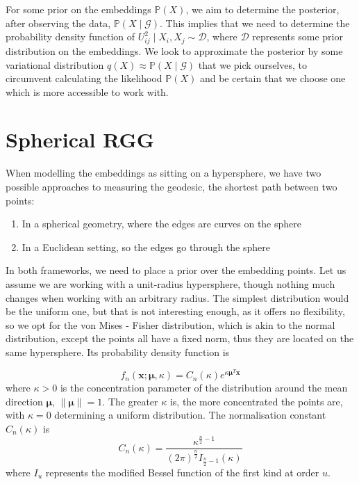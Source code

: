 \documentclass[12pt]{report}
\newcommand{\bs}{\boldsymbol}
\newcommand{\mc}[1]{\mathcal{#1}}
\newcommand{\mb}[1]{\mathbb{#1}}
\renewcommand{\bs}{\boldsymbol}
\begin{document}
For some prior on the embeddings $\mb{P}(X)$, we aim to determine the posterior, after observing the data, $\mb{P}(X \mid \mc{G})$. This implies that we need to determine the probability density function of $U_{ij}^2 \mid X_i, X_j \sim \mc{D}$, where $\mc{D}$ represents some prior distribution on the embeddings. We look to approximate the posterior by some variational distribution $q(X) \approx \mb{P}(X \mid \mc{G})$ that we pick ourselves, to circumvent calculating the likelihood $\mb{P}(X)$ and be certain that we choose one which is more accessible to work with. \\ 

\section{Spherical RGG}
When modelling the embeddings as sitting on a hypersphere, we have two possible approaches to measuring the geodesic, the shortest path between two points:
\begin{enumerate}
    \item In a spherical geometry, where the edges are curves on the sphere
    \item In a Euclidean setting, so the edges go through the sphere
\end{enumerate}

In both frameworks, we need to place a prior over the embedding points. Let us assume we are working with a unit-radius hypersphere, though nothing much changes when working with an arbitrary radius. The simplest distribution would be the uniform one, but that is not interesting enough, as it offers no flexibility, so we opt for the von Mises - Fisher distribution, which is akin to the normal distribution, except the points all have a fixed norm, thus they are located on the same hypersphere. Its probability density function is

\begin{equation}
    f_n(\bs{x}; \bs{\mu}, \kappa) = C_n(\kappa) e^{\kappa \bs{\mu}^T \bs{x}}
\end{equation}
where $\kappa > 0$ is the concentration parameter of the distribution around the mean direction $\bs{\mu}$, $\lVert \bs{\mu} \rVert = 1$. The greater $\kappa$ is, the more concentrated the points are, with $\kappa = 0$ determining a uniform distribution. The normalisation constant $C_n(\kappa)$ is
\begin{equation}
    C_n(\kappa) = \frac{\kappa^{\frac{n}{2} - 1}}{(2\pi)^{\frac{n}{2}}I_{\frac{n}{2} - 1}(\kappa)}
\end{equation}
where $I_u$ represents the modified Bessel function of the first kind at order $u$. \\
\end{document}
